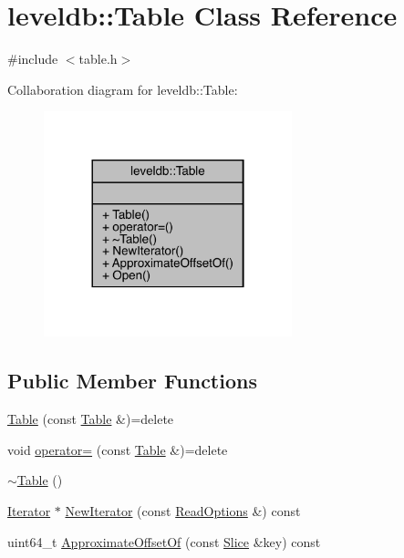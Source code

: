 \hypertarget{classleveldb_1_1_table}{}\section{leveldb\+::Table Class Reference}
\label{classleveldb_1_1_table}


{\ttfamily \#include $<$table.\+h$>$}



Collaboration diagram for leveldb\+::Table\+:
\nopagebreak
\begin{figure}[H]
\begin{center}
\leavevmode
\includegraphics[width=204pt]{classleveldb_1_1_table__coll__graph}
\end{center}
\end{figure}
\subsection*{Public Member Functions}
\begin{DoxyCompactItemize}
\item 
\mbox{\hyperlink{classleveldb_1_1_table_a7ad26fdc3703c49c6096bf08236b7a49}{Table}} (const \mbox{\hyperlink{classleveldb_1_1_table}{Table}} \&)=delete
\item 
void \mbox{\hyperlink{classleveldb_1_1_table_a75d9085263d90ecbebb0416118fbc977}{operator=}} (const \mbox{\hyperlink{classleveldb_1_1_table}{Table}} \&)=delete
\item 
\mbox{\hyperlink{classleveldb_1_1_table_a945f1f97b4f53402f5d55422a4dd3af2}{$\sim$\+Table}} ()
\item 
\mbox{\hyperlink{classleveldb_1_1_iterator}{Iterator}} $\ast$ \mbox{\hyperlink{classleveldb_1_1_table_a022289eb109fe9b143052b5ed852096d}{New\+Iterator}} (const \mbox{\hyperlink{structleveldb_1_1_read_options}{Read\+Options}} \&) const
\item 
uint64\+\_\+t \mbox{\hyperlink{classleveldb_1_1_table_ae9f828f621836e12d154cbe78d6fba3e}{Approximate\+Offset\+Of}} (const \mbox{\hyperlink{classleveldb_1_1_slice}{Slice}} \&key) const
\end{DoxyCompactItemize}

